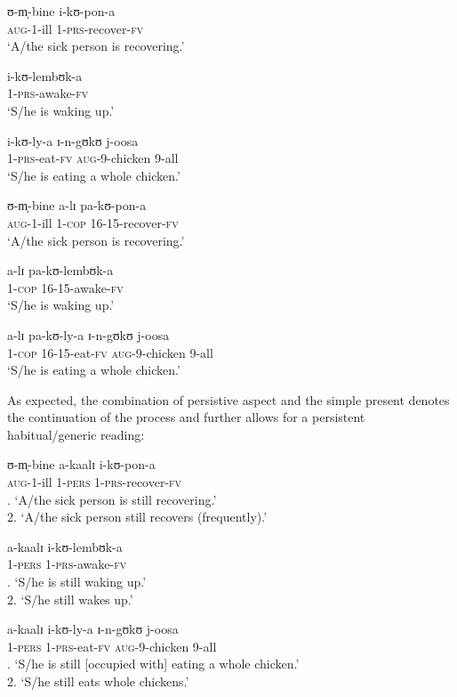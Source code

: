 \begin{exe}
\ex \label{exSimpleAccomplishmentPRS}
\begin{xlist}
\ex \gll ʊ-m̩-bine i-kʊ-pon-a\\
\textsc{aug}-1-ill 1-\textsc{prs}-recover-\textsc{fv}\\
\glt \lq A/the sick person is recovering.'

\ex \gll i-kʊ-lembʊk-a\\
1-\textsc{prs}-awake-\textsc{fv}\\
\glt \lq S/he is waking up.'

\ex \gll i-kʊ-ly-a ɪ-n-gʊkʊ j-oosa\\
1-\textsc{prs}-eat-\textsc{fv} \textsc{aug}-9-chicken 9-all\\
\glt \lq S/he is eating a whole chicken.'
\end{xlist}
\ex \label{exSimpleAccomplishmentPROG}
\begin{xlist}
\ex \gll ʊ-m̩-bine a-lɪ pa-kʊ-pon-a\\
\textsc{aug}-1-ill 1-\textsc{cop} 16-15-recover-\textsc{fv}\\
\glt \lq A/the sick person is recovering.'

\ex \gll a-lɪ pa-kʊ-lembʊk-a\\
1-\textsc{cop} 16-15-awake-\textsc{fv}\\
\glt \lq S/he is waking up.'

\ex \gll a-lɪ pa-kʊ-ly-a ɪ-n-gʊkʊ j-oosa\\
1-\textsc{cop} 16-15-eat-\textsc{fv} \textsc{aug}-9-chicken 9-all\\
\glt \lq S/he is eating a whole chicken.'
\end{xlist}
\end{exe}

As expected, the combination of persistive aspect and the simple present denotes the continuation of the process and further allows for a persistent habitual/generic reading:

\begin{exe}
\ex
\begin{xlist}
\ex \gll ʊ-m̩-bine a-kaalɪ i-kʊ-pon-a\\
\textsc{aug}-1-ill 1-\textsc{pers} 1-\textsc{prs}-recover-\textsc{fv}\\
. \lq  A/the sick person is still recovering.'\\ 2. \lq  A/the sick person still recovers (frequently).'

\ex \gll a-kaalɪ i-kʊ-lembʊk-a\\
1-\textsc{pers} 1-\textsc{prs}-awake-\textsc{fv}\\
. \lq S/he is still waking up.'\\ 2. \lq S/he still wakes up.'

\ex \gll a-kaalɪ i-kʊ-ly-a ɪ-n-gʊkʊ j-oosa\\
1-\textsc{pers} 1-\textsc{prs}-eat-\textsc{fv} \textsc{aug}-9-chicken 9-all\\
. \lq S/he is still [occupied with] eating a whole chicken.'\\
2. \lq S/he still eats whole chickens.'
\end{xlist}
\end{exe}

